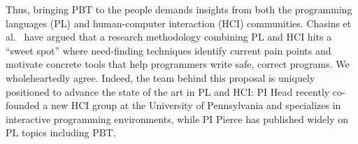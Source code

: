 
Thus, bringing PBT to the people
demands insights from both the programming languages (PL) and
human-computer interaction (HCI) communities.  Chasins et
al.~\cite{chasins_pl_2021} have argued that a research methodology
combining PL and HCI hits a ``sweet spot'' where need-finding techniques identify
current pain points and motivate concrete tools that help programmers write
safe, correct programs. We wholeheartedly agree.
Indeed, the team behind this proposal is uniquely positioned to advance the
state of the art in PL and HCI: PI Head recently co-founded
a new HCI group at the University of Pennsylvania and specializes in interactive
programming environments, while PI Pierce has
published widely on PL topics including PBT.  

\iflater
{}
\fi

